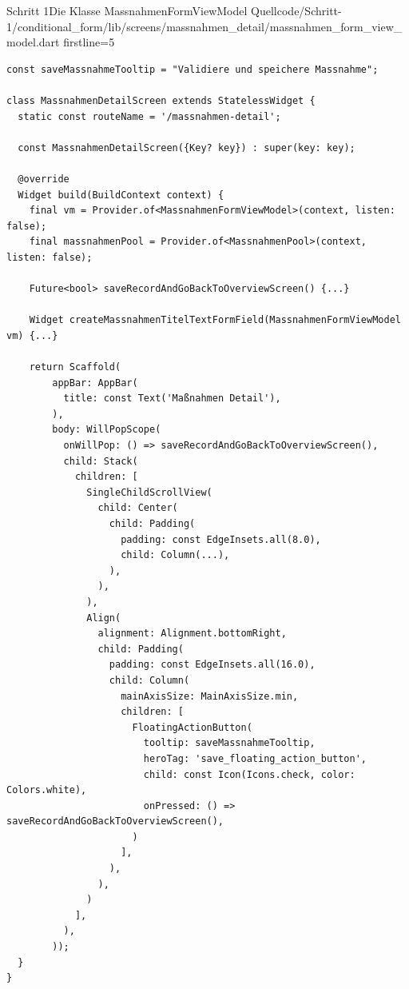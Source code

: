 \begin{alexlistingzwei}{Schritt 1}{Die Klasse MassnahmenFormViewModel}
  {Quellcode/Schritt-1/conditional_form/lib/screens/massnahmen_detail/massnahmen_form_view_model.dart}
  {firstline=5}
  \label{lst:Schritt1KlasseMassnahmenFormViewModel}
\end{alexlistingzwei}







\begin{listing}[htbp]
  \begin{verbatim}
const saveMassnahmeTooltip = "Validiere und speichere Massnahme";

class MassnahmenDetailScreen extends StatelessWidget {
  static const routeName = '/massnahmen-detail';

  const MassnahmenDetailScreen({Key? key}) : super(key: key);

  @override
  Widget build(BuildContext context) {
    final vm = Provider.of<MassnahmenFormViewModel>(context, listen: false);
    final massnahmenPool = Provider.of<MassnahmenPool>(context, listen: false);

    Future<bool> saveRecordAndGoBackToOverviewScreen() {...}

    Widget createMassnahmenTitelTextFormField(MassnahmenFormViewModel vm) {...}

    return Scaffold(
        appBar: AppBar(
          title: const Text('Maßnahmen Detail'),
        ),
        body: WillPopScope(
          onWillPop: () => saveRecordAndGoBackToOverviewScreen(),
          child: Stack(
            children: [
              SingleChildScrollView(
                child: Center(
                  child: Padding(
                    padding: const EdgeInsets.all(8.0),
                    child: Column(...),
                  ),
                ),
              ),
              Align(
                alignment: Alignment.bottomRight,
                child: Padding(
                  padding: const EdgeInsets.all(16.0),
                  child: Column(
                    mainAxisSize: MainAxisSize.min,
                    children: [
                      FloatingActionButton(
                        tooltip: saveMassnahmeTooltip,
                        heroTag: 'save_floating_action_button',
                        child: const Icon(Icons.check, color: Colors.white),
                        onPressed: () => saveRecordAndGoBackToOverviewScreen(),
                      )
                    ],
                  ),
                ),
              )
            ],
          ),
        ));
  }
}
\end{verbatim}
  \caption[Schritt 1 Klasse MassnahmenDetailScreen Struktur]{Die Struktur des Bildschirms MassnahmenDetailScreen, Quelle: Eigenes Listing, Datei: Quellcode/Schritt-1/conditional_form/lib/\newline screens/massnahmen_detail/massnahmen_detail.dart}
  \label{lst:Schritt1KlasseMassnahmenDetailScreenStruktur}
\end{listing}


